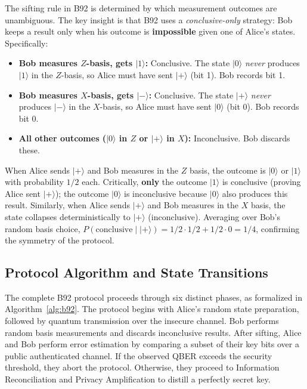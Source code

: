 \documentclass[conference]{IEEEtran}
\begin{document}
The sifting rule in B92 is determined by which measurement outcomes are unambiguous. The key insight is that B92 uses a \textit{conclusive-only} strategy: Bob keeps a result only when his outcome is \textbf{impossible} given one of Alice's states. Specifically:

\begin{itemize}
  \item \textbf{Bob measures $Z$-basis, gets $|1\rangle$:} Conclusive. The state $|0\rangle$ \textit{never} produces $|1\rangle$ in the $Z$-basis, so Alice must have sent $|{+}\rangle$ (bit 1). Bob records bit 1.
  \item \textbf{Bob measures $X$-basis, gets $|-\rangle$:} Conclusive. The state $|{+}\rangle$ \textit{never} produces $|-\rangle$ in the $X$-basis, so Alice must have sent $|0\rangle$ (bit 0). Bob records bit 0.
  \item \textbf{All other outcomes ($|0\rangle$ in $Z$ or $|{+}\rangle$ in $X$):} Inconclusive. Bob discards these.
\end{itemize}

When Alice sends $|{+}\rangle$ and Bob measures in the $Z$ basis, the outcome is $|0\rangle$ or $|1\rangle$ with probability $1/2$ each. Critically, \textbf{only} the outcome $|1\rangle$ is conclusive (proving Alice sent $|{+}\rangle$); the outcome $|0\rangle$ is inconclusive because $|0\rangle$ also produces this result. Similarly, when Alice sends $|{+}\rangle$ and Bob measures in the $X$ basis, the state collapses deterministically to $|{+}\rangle$ (inconclusive). Averaging over Bob's random basis choice, $P(\text{conclusive} \mid |{+}\rangle) = 1/2 \cdot 1/2 + 1/2 \cdot 0 = 1/4$, confirming the symmetry of the protocol.


\subsection{Protocol Algorithm and State Transitions}
The complete B92 protocol proceeds through six distinct phases, as formalized in Algorithm~\ref{alg:b92}. The protocol begins with Alice's random state preparation, followed by quantum transmission over the insecure channel. Bob performs random basis measurements and discards inconclusive results. After sifting, Alice and Bob perform error estimation by comparing a subset of their key bits over a public authenticated channel. If the observed QBER exceeds the security threshold, they abort the protocol. Otherwise, they proceed to Information Reconciliation and Privacy Amplification to distill a perfectly secret key.
\end{document}
